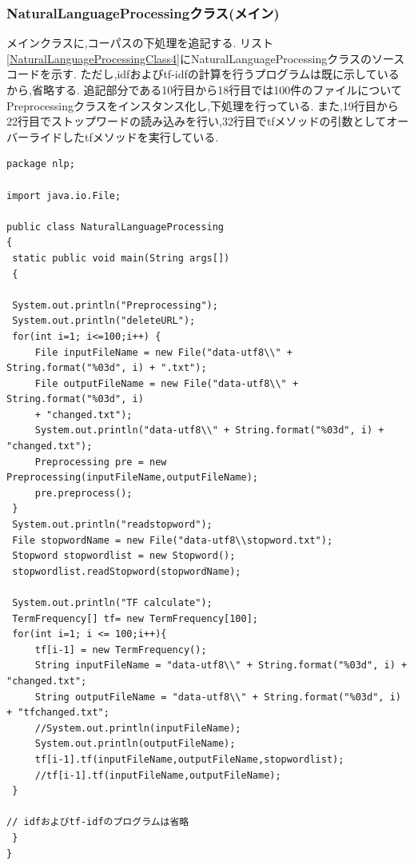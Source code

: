 \documentclass[a4j]{jarticle}
\begin{document}
\subsubsection{NaturalLanguageProcessingクラス(メイン)}
メインクラスに,コーパスの下処理を追記する.
リスト\ref{NaturalLanguageProcessingClass4}にNaturalLanguageProcessingクラスのソースコードを示す.
ただし,idfおよびtf-idfの計算を行うプログラムは既に示しているから,省略する.
追記部分である10行目から18行目では100件のファイルについてPreprocessingクラスをインスタンス化し,下処理を行っている.
また,19行目から22行目でストップワードの読み込みを行い,32行目でtfメソッドの引数としてオーバーライドしたtfメソッドを実行している.
\begin{lstlisting}[basicstyle=\ttfamily\footnotesize, frame=single,label=NaturalLanguageProcessingClass4,caption=NaturalLanguageProcessingクラスのソースコード(追記)]
package nlp;

import java.io.File;

public class NaturalLanguageProcessing
{
 static public void main(String args[])
 {

 System.out.println("Preprocessing");
 System.out.println("deleteURL");
 for(int i=1; i<=100;i++) {
	 File inputFileName = new File("data-utf8\\" + String.format("%03d", i) + ".txt");
	 File outputFileName = new File("data-utf8\\" + String.format("%03d", i) 
	 + "changed.txt");
	 System.out.println("data-utf8\\" + String.format("%03d", i) + "changed.txt");
	 Preprocessing pre = new Preprocessing(inputFileName,outputFileName);
	 pre.preprocess();
 }
 System.out.println("readstopword");
 File stopwordName = new File("data-utf8\\stopword.txt");
 Stopword stopwordlist = new Stopword();
 stopwordlist.readStopword(stopwordName);

 System.out.println("TF calculate");
 TermFrequency[] tf= new TermFrequency[100];
 for(int i=1; i <= 100;i++){
	 tf[i-1] = new TermFrequency();
	 String inputFileName = "data-utf8\\" + String.format("%03d", i) + "changed.txt";
	 String outputFileName = "data-utf8\\" + String.format("%03d", i) + "tfchanged.txt";
	 //System.out.println(inputFileName);
	 System.out.println(outputFileName);
	 tf[i-1].tf(inputFileName,outputFileName,stopwordlist);
	 //tf[i-1].tf(inputFileName,outputFileName);
 }

// idfおよびtf-idfのプログラムは省略
 }
}

\end{lstlisting}
\end{document}
